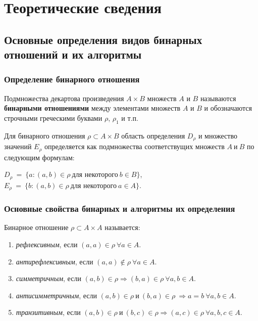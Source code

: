 \documentclass[bachelor, och, labwork]{shiza}
\begin{document}
\section{Теоретические сведения}

\subsection{Основные определения видов бинарных отношений и их алгоритмы}

\subsubsection{Определение бинарного отношения}

Подмножества декартова произведения $A \times B$ множеств $A$ и $B$ называются
\textbf{бинарными отношениями} между элементами множеств $A$ и $B$ и 
обозначаются строчными греческими буквами $\rho$, $\rho_1$ и т.п.

Для бинарного отношения $\rho\subset A \times B$ область определения $D_\rho$ и 
множество значений $E_\rho$ определяется как подмножества соответствущих множеств 
$A ~\text{и}~ B$ по следующим формулам:

\begin{center}
    $D_\rho ~ = ~ \{a : (a, b) \in\rho ~ \text{для некоторого} ~ b \in B\}$,
    $E_\rho ~ = ~ \{b : (a, b) \in\rho ~ \text{для некоторого} ~ a \in A\}$.
\end{center}

\subsubsection{Основные свойства бинарных и алгоритмы их определения}

Бинарное отношение $\rho \subset A \times A$ называется:

\begin{enumerate}
    
    \item \textit{рефлексивным}, если $(a,a)\in\rho~\forall a \in A$.
    
    \item \textit{антирефлексивным}, если $(a,a)\not\in\rho~\forall a \in A$.
    
    \item \textit{симметричным}, если $(a,b)\in\rho\Rightarrow (b,a)\in\rho~\forall a,b\in A$.
    
    \item \textit{антисимметричным}, если $(a,b) \in\rho~\text{и}~(b,a) \in\rho ~ \Rightarrow a = b ~\forall a,b \in A$.
    
    \item \textit{транзитивным}, если $(a,b)\in\rho ~\text{и}~ (b,c)\in\rho\Rightarrow (a,c) \in\rho ~\forall a,b,c \in A $.

\end{enumerate}
\end{document}

